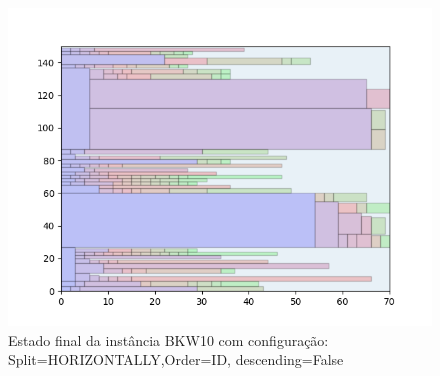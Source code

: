 \begin{figure}[H]
    \centering
    \caption[]{Estado final da instância BKW10 com configuração: Split=HORIZONTALLY,Order=ID, descending=False}
    \label{fig:bkw10-horizontally-id-false}
    \includegraphics[scale=0.5]{output/figures/bkw/bkw10/horizontally/id/false/000}
\end{figure}